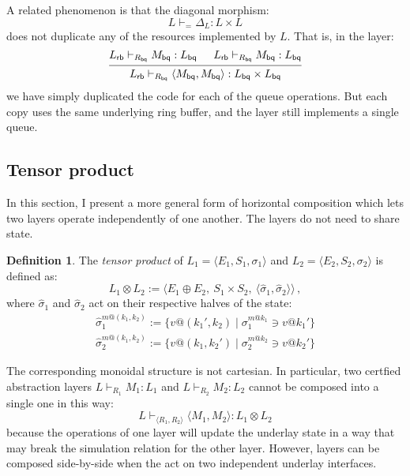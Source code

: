 \documentclass[11pt,oneside,draft]{book}
\theoremstyle{definition}
\newtheorem{definition}[theorem]{Definition}
\newcommand{\kw}[1]{\ensuremath{ \mathsf{#1} }}
\begin{document}
A related phenomenon is
that the diagonal morphism:
\[
  L \vdash_{=} \Delta_L : L \times L
\]
does not duplicate any of the resources implemented by $L$.
That is, in the layer:
\[
  \begin{prooftree}
    \hypo{L_\kw{rb} \vdash_{R_\kw{bq}} M_\kw{bq} : L_\kw{bq}}
    \hypo{L_\kw{rb} \vdash_{R_\kw{bq}} M_\kw{bq} : L_\kw{bq}}
    \infer2{L_\kw{rb} \vdash_{R_\kw{bq}}
      \langle M_\kw{bq}, M_\kw{bq} \rangle :
      L_\kw{bq} \times L_\kw{bq}}
  \end{prooftree}
\]
we have simply duplicated the code for each of the queue operations.
But each copy uses the same underlying ring buffer,
and the layer still implements a single queue.


\subsection{Tensor product} \label{sec:layermon} %

In this section,
I present a more general form of horizontal composition
which lets two layers operate independently of one another.
The layers do not need to share state.

\begin{definition}
The \emph{tensor product} of
$L_1 = \langle E_1, S_1, \sigma_1 \rangle$ and
$L_2 = \langle E_2, S_2, \sigma_2 \rangle$
is defined as:
\[
  L_1 \otimes L_2 := \langle
    E_1 \oplus E_2, \:
    S_1 \times S_2, \:
    \langle \hat{\sigma}_1, \hat{\sigma}_2 \rangle
  \rangle \,,
\]
where $\hat{\sigma}_1$ and $\hat{\sigma}_2$
act on their respective halves of the state:
\begin{gather*}
  \hat{\sigma}_1^{m@(k_1, k_2)} :=
    \{ v@(k_1', k_2) \mid \sigma_1^{m@k_1} \ni v@k_1' \} \\
  \hat{\sigma}_2^{m@(k_1, k_2)} :=
    \{ v@(k_1, k_2') \mid \sigma_2^{m@k_2} \ni v@k_2' \}
\end{gather*}
\end{definition}

The corresponding monoidal structure is not cartesian.
In particular, two certfied abstraction layers
$L \vdash_{R_1} M_1 : L_1$ and
$L \vdash_{R_2} M_2 : L_2$
cannot be composed into a single one in this way:
\[
  L \vdash_{\langle R_1, R_2 \rangle} \langle M_1, M_2 \rangle : L_1
\otimes L_2
\]
because the operations of one layer will update the underlay state
in a way that may break the simulation relation for the other layer.
However, layers can be composed side-by-side
when the act on two independent underlay interfaces.
\end{document}
